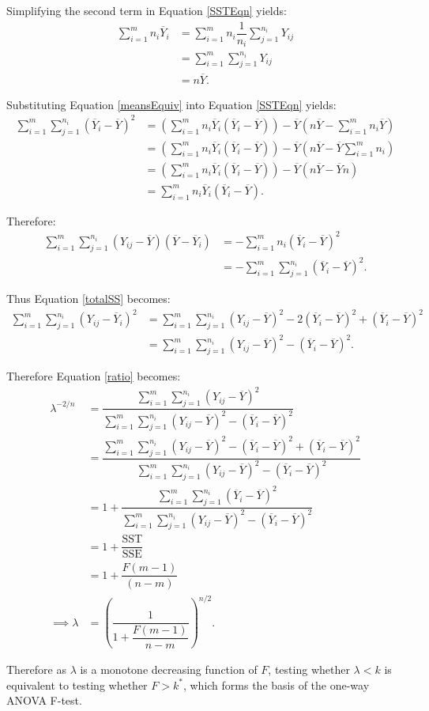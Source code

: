 \documentclass[12pt,a4paper,openright]{article}
\newcommand{\eqn}[1]{Equation \ref{#1}}
\newcommand{\ovY}{\overline{Y}}
\newcommand{\SST}{\mathrm{SST}}
\newcommand{\SSE}{\mathrm{SSE}}
\begin{document}
	Simplifying the second term in \eqn{SSTEqn} yields:
	\begin{align}
		\sum_{i=1}^m n_i \ovY_i &= \sum_{i=1}^m n_i \dfrac{1}{n_i} \sum_{j=1}^{n_i} Y_{ij} \nonumber \\
		&= \sum_{i=1}^m \sum_{j=1}^{n_i} Y_{ij} \nonumber \\
		&= n\ovY. \label{meansEquiv}
	\end{align}

	Substituting \eqn{meansEquiv} into \eqn{SSTEqn} yields:
	\begin{align*}
		\sum_{i=1}^m \sum_{j=1}^{n_i} (\ovY_i-\ovY)^2 &= \left(\sum_{i=1}^m n_i \ovY_i (\ovY_i - \ovY)\right) - \ovY (n\ovY -\sum_{i=1}^m n_i\ovY) \\
		&= \left(\sum_{i=1}^m n_i \ovY_i (\ovY_i - \ovY)\right) - \ovY (n\ovY - \ovY \sum_{i=1}^m n_i) \\
		&= \left(\sum_{i=1}^m n_i \ovY_i (\ovY_i - \ovY)\right) - \ovY (n\ovY - \ovY n) \\
		&= \sum_{i=1}^m n_i \ovY_i (\ovY_i - \ovY).
	\end{align*}
	
	Therefore:
	\begin{align*}
		\sum_{i=1}^m \sum_{j=1}^{n_i} (Y_{ij}-\ovY)(\ovY - \ovY_i) &= -\sum_{i=1}^m n_i (\ovY_i-\ovY)^2 \\
		&= -\sum_{i=1}^m \sum_{j=1}^{n_i} (\ovY_i-\ovY)^2.
	\end{align*}

	Thus \eqn{totalSS} becomes:
	\begin{align*}
		\sum_{i=1}^m \sum_{j=1}^{n_i} (Y_{ij}-\ovY_i)^2 &= \sum_{i=1}^m \sum_{j=1}^{n_i} (Y_{ij}-\ovY)^2 - 2(\ovY_i-\ovY)^2 + (\ovY_i-\ovY)^2 \\
		&= \sum_{i=1}^m \sum_{j=1}^{n_i} (Y_{ij}-\ovY)^2 - (\ovY_i-\ovY)^2.
	\end{align*}

	Therefore \eqn{ratio} becomes:
	\begin{align*}
		\lambda^{-2/n} &= \dfrac{\sum_{i=1}^m \sum_{j=1}^{n_i} (Y_{ij}-\ovY)^2}{\sum_{i=1}^m \sum_{j=1}^{n_i} (Y_{ij}-\ovY)^2 - (\ovY_i-\ovY)^2} \\
		&= \dfrac{\sum_{i=1}^m \sum_{j=1}^{n_i} (Y_{ij}-\ovY)^2 - (\ovY_i-\ovY)^2 + (\ovY_i-\ovY)^2}{\sum_{i=1}^m \sum_{j=1}^{n_i} (Y_{ij}-\ovY)^2 - (\ovY_i-\ovY)^2} \\
		&= 1 + \dfrac{\sum_{i=1}^m \sum_{j=1}^{n_i} (\ovY_i-\ovY)^2}{\sum_{i=1}^m \sum_{j=1}^{n_i} (Y_{ij}-\ovY)^2 - (\ovY_i-\ovY)^2} \\
		&= 1 + \dfrac{\SST}{\SSE} \\
		&= 1 + \dfrac{F(m-1)}{(n-m)} \\
		\implies \lambda &= \left(\dfrac{1}{1+\dfrac{F(m-1)}{n-m}}\right)^{n/2}.
	\end{align*}

	Therefore as $\lambda$ is a monotone decreasing function of $F$, testing whether $\lambda < k$ is equivalent to testing whether $F > k^{*}$, which forms the basis of the one-way ANOVA F-test.  
\end{document}
